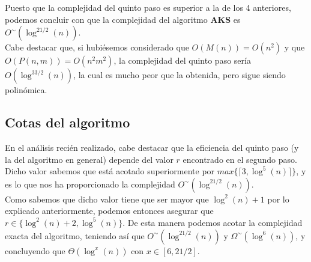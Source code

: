 Puesto que la complejidad del quinto paso es superior a la de los 4 anteriores, podemos concluir con que la complejidad del algoritmo \textbf{AKS} es $O^\sim(\log^{21/2}(n))$.\\

Cabe destacar que, si hubiésemos considerado que $O(M(n)) = O(n^2)$ y que $O(P(n, m)) = O(n^2m^2)$, la complejidad del quinto paso sería $O(\log^{33/2}(n))$, la cual es mucho peor que la obtenida, pero sigue siendo polinómica.

\subsection{Cotas del algoritmo}

En el análisis recién realizado, cabe destacar que la eficiencia del quinto paso (y la del algoritmo en general) depende del valor $r$ encontrado en el segundo paso. Dicho valor sabemos que está acotado superiormente por $max\{\lceil 3, \log^5(n) \rceil\}$, y es lo que nos ha proporcionado la complejidad $O^\sim(\log^{21/2}(n))$.\\

Como sabemos que dicho valor tiene que ser mayor que $\log^2(n) + 1$ por lo explicado anteriormente, podemos entonces asegurar que $r \in \{\log^2(n) + 2, \log^5(n)\}$. De esta manera podemos acotar la complejidad exacta del algoritmo, teniendo así que $O^\sim(\log^{21/2}(n))$ y $\Omega^\sim(\log^6(n))$, y concluyendo que $\Theta(\log^x(n))$ con $x \in [6, 21/2]$.

\endinput
